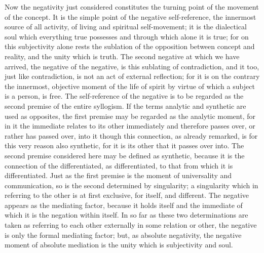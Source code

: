Now the negativity just considered constitutes
the turning point of the movement of the concept.
It is the simple point of the negative self-reference,
the innermost source of all activity,
of living and spiritual self-movement;
it is the dialectical soul which everything true possesses
and through which alone it is true;
for on this subjectivity alone rests
the sublation of the opposition
between concept and reality,
and the unity which is truth.
The second negative at which we have arrived,
the negative of the negative,
is this sublating of contradiction,
and it too, just like contradiction,
is not an act of external reflection;
for it is on the contrary the innermost,
objective moment of the life of spirit
by virtue of which a subject is a person, is free.
The self-reference of the negative is to be regarded
as the second premise of the entire syllogism.
If the terms analytic and synthetic are used as opposites,
the first premise may be regarded as the analytic moment,
for in it the immediate relates to its other immediately
and therefore passes over, or rather has passed over,
into it though this connection, as already remarked,
is for this very reason also synthetic,
for it is its other that it passes over into.
The second premise considered here may be defined as synthetic,
because it is the connection of the differentiated, as differentiated,
to that from which it is differentiated.
Just as the first premise is
the moment of universality and communication,
so is the second determined by singularity;
a singularity which in referring to the other is at first exclusive, for itself,
and different. The negative appears as the mediating factor, because it holds
itself and the immediate of which it is the negation within itself. In so far
as these two determinations are taken as referring to each other externally
in some relation or other, the negative is only the formal mediating factor;
but, as absolute negativity, the negative moment of absolute mediation is
the unity which is subjectivity and soul.

